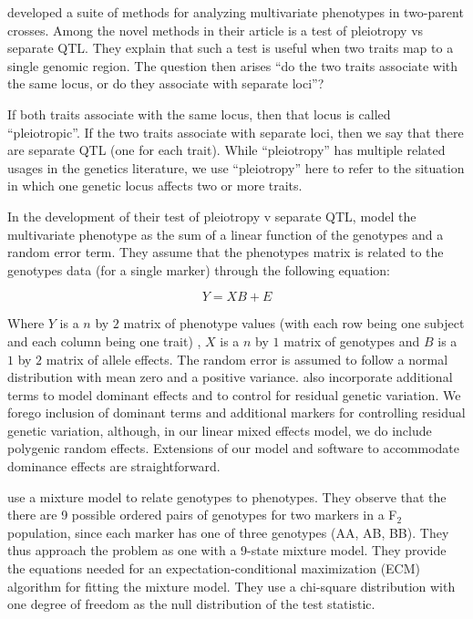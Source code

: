 \documentclass[oneside]{book}\usepackage[]{graphicx}\usepackage[]{color}
\begin{document}
\citet{jiang1995multiple} developed a suite of methods for analyzing multivariate phenotypes in
two-parent crosses.
Among the novel methods in their article is a test of pleiotropy vs separate QTL.
They explain that such a test is useful when two traits map to a single genomic region.
The question then arises ``do the two traits associate with the same locus, or do they associate with separate loci''?

If both traits associate with the same locus, then that locus is called ``pleiotropic''. If the two traits associate with separate loci, then we say that there are separate QTL (one for each trait). While ``pleiotropy'' has multiple related usages in the genetics literature, we use ``pleiotropy'' here to refer to the situation in which one genetic locus affects two or more traits. 

In the development of their test of pleiotropy v separate QTL, \citet{jiang1995multiple} model
the multivariate phenotype as the sum of a linear function of the genotypes and a random error term. They assume that the phenotypes matrix is related to the genotypes data (for a single marker) through the following equation:


\begin{equation}
Y = XB + E
\end{equation}


\noindent Where $Y$ is a $n$ by $2$ matrix of phenotype values (with each row being one subject and each column being one trait)
, $X$ is a $n$ by $1$ matrix of genotypes and $B$ is a $1$ by $2$ matrix of allele effects.
The random error is assumed to follow a normal distribution with mean zero and a positive variance.
\citet{jiang1995multiple} also incorporate additional terms to model dominant effects and to
control for residual genetic variation.
We forego inclusion of dominant terms and additional markers for controlling residual
genetic variation, although, in our linear mixed effects model, we do include polygenic random
effects. 
Extensions of our model and software to accommodate dominance effects are straightforward.


\citet{jiang1995multiple} use a mixture model to relate genotypes to phenotypes. 
They observe that the there are 9 possible ordered pairs of genotypes for two markers in a F$_2$ population, since each marker has one of three genotypes (AA, AB, BB).
They thus approach the problem as one with a 9-state mixture model. 
They provide the equations needed for an expectation-conditional maximization
(ECM) algorithm for fitting the mixture model.
They use a chi-square distribution with one degree of freedom as the
null distribution of the test statistic. 
\end{document}
